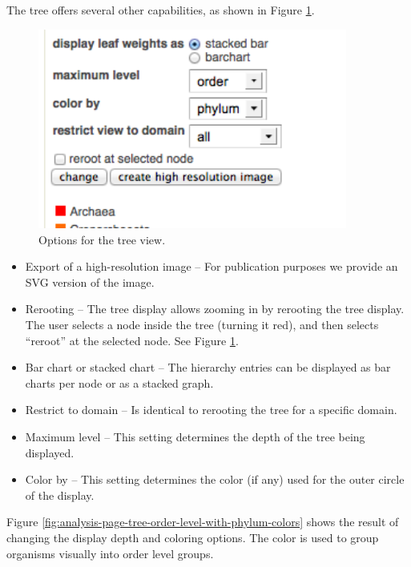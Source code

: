 \documentclass[12pt,fullpage]{report}
\begin{document}
The tree offers several other capabilities, as shown in Figure \ref{fig:analysis-page-tree-options}.

\begin{figure}[ht]
\begin{center}
\includegraphics[width=4in]{Images/analysis-page-tree-options.png}
\end{center}
\caption{
Options for the tree view.
}
\label{fig:analysis-page-tree-options}
\end{figure}

\begin{itemize}

\item Export of a high-resolution image --
For publication purposes we provide an SVG version of the image.

\item Rerooting --
The tree display allows zooming in by rerooting the tree display. The user selects a node inside the tree (turning it red), and then selects ``reroot'' at the selected node. See Figure \ref{fig:analysis-page-tree-options}.

\item Bar chart or stacked chart --
The hierarchy entries can be displayed as bar charts per node or as a stacked graph.

\item Restrict to domain --
Is identical to rerooting the tree for a specific domain.

\item Maximum level --
This setting determines the depth of the tree being displayed.

\item Color by --
This setting determines the color (if any) used for the outer circle of the display.
\end{itemize}

Figure \ref{fig:analysis-page-tree-order-level-with-phylum-colors} shows the result of changing the display depth and coloring options. The color is used to group organisms visually into order level groups.
\end{document}
